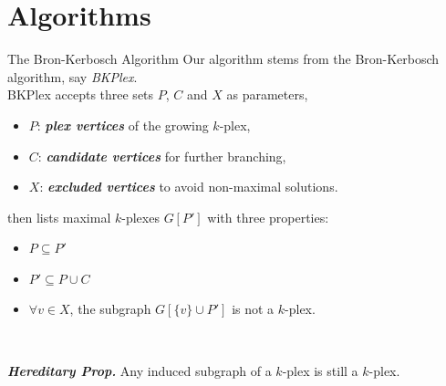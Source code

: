 \documentclass[9pt,notheorems]{beamer} %
\begin{document}
\section{Algorithms}
\begin{frame}{The Bron-Kerbosch Algorithm}
    Our algorithm stems from the Bron-Kerbosch algorithm, say \emph{BKPlex}.\\
    BKPlex accepts three sets $P$, $C$ and $X$ as parameters,
    \begin{itemize}
        \item $P$: \textbf{\emph{plex vertices}} of the growing $k$-plex,
        \item $C$: \textbf{\emph{candidate vertices}} for further branching,
        \item $X$: \textbf{\emph{excluded vertices}} to avoid non-maximal solutions.
    \end{itemize}
    then lists maximal $k$-plexes $G[P']$ with three properties: \\
    \begin{minipage}{0.14\linewidth}
        \begin{itemize}
            \item $P \subseteq P'$
        \end{itemize}
    \end{minipage}
    \begin{minipage}{0.18\linewidth}
        \begin{itemize}
            \item $P' \subseteq P\cup C$
        \end{itemize}
    \end{minipage}
    \begin{minipage}{0.65\linewidth}
        \begin{itemize}
            \item $\forall v\in X$, the subgraph $G[\{v\} \cup P']$ is not a $k$-plex.
        \end{itemize}
    \end{minipage}\\
    \vspace{0.25cm}
    \begin{flushright}
        \footnotesize \textbf{\emph{Hereditary Prop.}} Any induced subgraph of a $k$-plex is still a $k$-plex.
    \end{flushright}
\end{frame}
\end{document}
